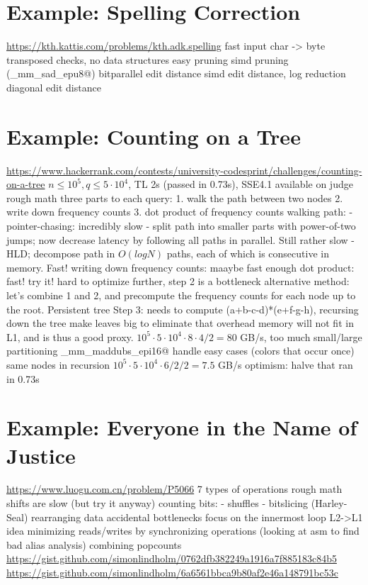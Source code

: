\documentclass[openany]{book}
\begin{document}
\chapter{Example: Spelling Correction}
\url{https://kth.kattis.com/problems/kth.adk.spelling}
fast input
char -> byte
transposed checks, no data structures
easy pruning
simd pruning (\verb@_mm_sad_epu8@)
bitparallel edit distance
simd edit distance, log reduction
diagonal edit distance

\chapter{Example: Counting on a Tree}
\url{https://www.hackerrank.com/contests/university-codesprint/challenges/counting-on-a-tree}
$n \le 10^5, q \le 5\cdot 10^4$, TL 2s (passed in 0.73s), SSE4.1 available on judge
rough math
three parts to each query:
1. walk the path between two nodes
2. write down frequency counts
3. dot product of frequency counts
walking path:
- pointer-chasing: incredibly slow
- split path into smaller parts with power-of-two jumps; now decrease latency by following all paths in parallel. Still rather slow
- HLD; decompose path in $O(log N)$ paths, each of which is consecutive in memory. Fast!
writing down frequency counts: maaybe fast enough
dot product: fast!
try it! hard to optimize further, step 2 is a bottleneck
alternative method: let's combine 1 and 2, and precompute the frequency counts for each node up to the root. Persistent tree
Step 3: needs to compute (a+b-c-d)*(e+f-g-h), recursing down the tree
make leaves big to eliminate that overhead
memory will not fit in L1, and is thus a good proxy. $10^5 \cdot 5\cdot 10^4 \cdot 8 \cdot 4 / 2 = 80$ GB/s, too much
small/large partitioning
\verb@_mm_maddubs_epi16@
handle easy cases (colors that occur once)
same nodes in recursion
$10^5 \cdot 5\cdot 10^4 \cdot 6 / 2 / 2 = 7.5$ GB/s
optimism: halve that
ran in 0.73s

\chapter{Example: Everyone in the Name of Justice}
\url{https://www.luogu.com.cn/problem/P5066}
7 types of operations
rough math
shifts are slow (but try it anyway)
counting bits:
- shuffles
- bitslicing (Harley-Seal)
rearranging data
accidental bottlenecks
focus on the innermost loop
L2->L1 idea
minimizing reads/writes by synchronizing operations
(looking at asm to find bad alias analysis)
combining popcounts
\url{https://gist.github.com/simonlindholm/0762dfb382249a1916a7f885183c84b5}
\url{https://gist.github.com/simonlindholm/6a6561bbca9b80af2e46a148791bc53c}
\end{document}
